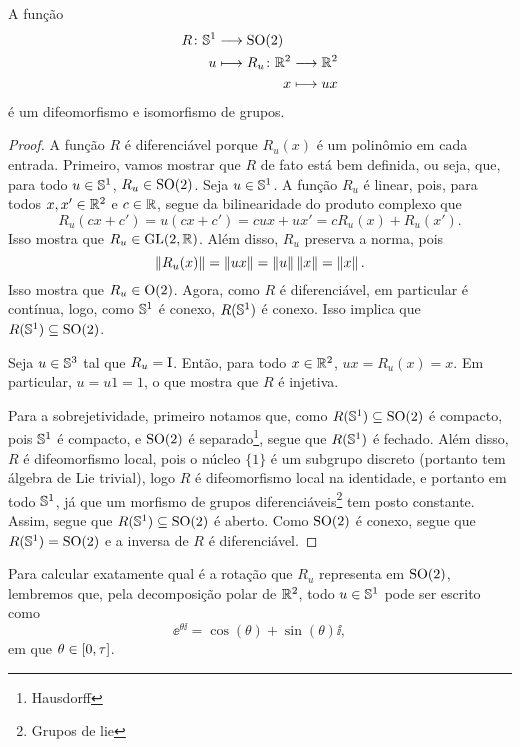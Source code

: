 \begin{proposition}
A função
	\begin{align*}
	\func{R}{\S^1}{\SO(2)}{u}{
		\begin{aligned}[t]
			\func{R_u}{\R^2}{\R^2}{x}{ux}
		\end{aligned}
	}
	\end{align*}
é um difeomorfismo e isomorfismo de grupos.
\end{proposition}
\begin{proof}
A função $R$ é diferenciável porque $R_u(x)$ é um polinômio em cada entrada. Primeiro, vamos mostrar que $R$ de fato está bem definida, ou seja, que, para todo $u \in \S^1$, $R_u \in \SO(2)$. Seja $u \in \S^1$. A função $R_u$ é linear, pois, para todos $x,x' \in \R^2$ e $c \in \R$, segue da bilinearidade do produto complexo que
	\begin{equation*}
	R_u(cx+c') = u(cx+c') = cux + ux' = cR_u(x) + R_u(x').
	\end{equation*}
Isso mostra que $R_u \in \GL(2,\R)$. Além disso, $R_u$ preserva a norma, pois
	\begin{equation*}
	\nor{R_u(x)} = \nor{ux} = \nor{u}\nor{x} = \nor{x}.
	\end{equation*}
Isso mostra que $R_u \in \OO(2)$. Agora, como $R$ é diferenciável, em particular é contínua, logo, como $\S^1$ é conexo, $R(\S^1)$ é conexo. Isso implica que $R(\S^1) \subseteq \SO(2)$.

Seja $u \in \S^3$ tal que $R_u = \Id$. Então, para todo $x \in \R^2$, $ux = R_u(x) = x$. Em particular, $u = u1 = 1$, o que mostra que $R$ é injetiva.

Para a sobrejetividade, primeiro notamos que, como $R(\S^1) \subseteq \SO(2)$ é compacto, pois $\S^1$ é compacto, e $\SO(2)$ é separado\footnote{Hausdorff}, segue que $R(\S^1)$ é fechado. Além disso, $R$ é difeomorfismo local, pois o núcleo $\{1\}$ é um subgrupo discreto (portanto tem álgebra de Lie trivial), logo $R$ é difeomorfismo local na identidade, e portanto em todo $\S^1$, já que um morfismo de grupos diferenciáveis\footnote{Grupos de lie} tem posto constante. Assim, segue que $R(\S^1) \subseteq \SO(2)$ é aberto. Como $\SO(2)$ é conexo, segue que $R(\S^1) = \SO(2)$ e a inversa de $R$ é diferenciável.
\end{proof}

Para calcular exatamente qual é a rotação que $R_u$ representa em $\SO(2)$, lembremos que, pela decomposição polar de $\R^2$, todo $u \in \S^1$ pode ser escrito como
	\begin{equation*}
	\ee^{\theta\ii} = \cos(\theta) + \sin(\theta)\ii,
	\end{equation*}
em que $\theta \in \intff{0}{\tau}$.

